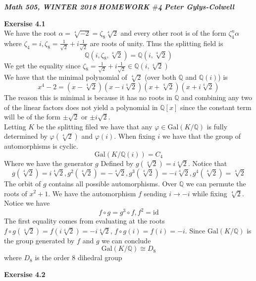 \documentclass[12pt]{article}
\newenvironment{ques}[1]{\textbf{Exersise #1}\vspace{1 mm}\\ }{\bigskip}
\theoremstyle{definition}
\newcommand{\Q}{\mathbb Q}
\newcommand{\C}{\mathbb C}
\renewcommand{\a}{\alpha}
\newcommand{\Gal}{\text{Gal}}
\newcommand{\id}{\text{id}}
\begin{document}
\noindent \textit{\textbf{Math 505, WINTER 2018}} \hspace{1.3cm}
\textit{\textbf{HOMEWORK $\#$4}} \hspace{1.3cm} \textit{\textbf{Peter
Gylys-Colwell}} 

\vspace{1cm}

\begin{ques}{4.1}
	We have the root $\a = \sqrt[4]{-2} = \zeta_8\sqrt[4]{2}$ and every other root is
	of the form $\zeta_4^n\a$ where $\zeta_4 = i, \zeta_8 = \frac 1 {\sqrt 2} +
	i \frac 1 {\sqrt 2}$ are roots of unity. Thus the splitting field is
	$$\Q(i,\zeta_8, \sqrt[4]{2}) = \Q(i, \sqrt[4]{2})$$
	We get the equality since $\zeta_8 = \frac 1 {\sqrt 2} + i \frac 1 {\sqrt 2} \in
	\Q(i,\sqrt[4]{2})$ \\
	We have that the minimal polynomial of $\sqrt[4]{2}$ (over both $\Q$ and $\Q(i)$) is 
	$$x^4 - 2 = (x - \sqrt[4]{2})(x - i\sqrt[4]{2})(x + \sqrt[4]{2})(x +
	i\sqrt[4]{2})$$
	The reason this is minimal is because it has no roots in $\Q$ and combining
	any two of the linear factors does not yield a polynomial in $\Q[x]$ since
	the constant term will be of the form $\pm\sqrt 2$ or $\pm i\sqrt 2$.\\
	Letting $K$ be the splitting filed we have that any $\varphi \in \Gal(K/\Q)$
	is fully determined by $\varphi(\sqrt[4]{2})$ and $\varphi(i)$. When fixing
	$i$ we have that the group of automorphisms is cyclic.
	$$\Gal(K/ \Q(i)) = C_4$$
	Where we have the generator $g$ Defined by $g(\sqrt[4]{2}) =
	i\sqrt[4]{2}$. Notice that
	$$g(\sqrt[4]{2}) = i\sqrt[4]{2}, g^2(\sqrt[4]{2}) = -\sqrt[4]{2},
	g^3(\sqrt[4]{2}) = -i\sqrt[4]{2}, g^4(\sqrt[4]{2}) = \sqrt[4]{2}$$
	The orbit of $g$ contains all possible automorphisms. Over $\Q$ we can
	permute the roots of $x^2 + 1$. We have the automorphism $f$ sending $i \to
	-i$ while fixing $\sqrt[4]{2}$. Notice we have
	$$f \circ g = g^3 \circ f, f^2 = \id$$
	The first equality comes from evaluating at the roots $f \circ
	g(\sqrt[4]{2}) = f(i\sqrt[4]{2}) = -i\sqrt[4]{2}$, $f \circ g(i) = f(i) =
	-i$. Since $\Gal(K/\Q)$ is the group generated by $f$ and $g$ we can conclude
	$$\Gal(K/\Q) \cong D_8$$
	where $D_8$ is the order $8$ dihedral group 
\end{ques}

\begin{ques}{4.2}
\end{ques}
\end{document}
